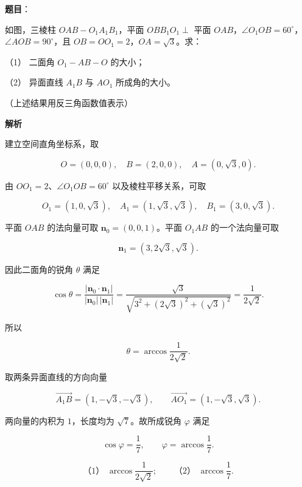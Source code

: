 \begin{answer}

\textbf{题目}：

如图，三棱柱 $OAB-O_1A_1B_1$，平面 $OBB_1O_1\perp$ 平面 $OAB$，$\angle O_1OB=60^\circ$，$\angle AOB=90^\circ$，且 $OB=OO_1=2$，$OA=\sqrt3$。求：
\nopagebreak[4]
\begin{center}\end{center}
\nopagebreak[4]
（1） 二面角 $O_1-AB-O$ 的大小；

（2） 异面直线 $A_1B$ 与 $AO_1$ 所成角的大小。

（上述结果用反三角函数值表示）

\textbf{解析}

建立空间直角坐标系，取

\nopagebreak[4]
\[
O=(0,0,0),\quad B=(2,0,0),\quad A=(0,\sqrt3,0).
\]

由 $OO_1=2$、$\angle O_1OB=60^\circ$ 以及棱柱平移关系，可取

\nopagebreak[4]
\[
O_1=(1,0,\sqrt3),\quad
A_1=(1,\sqrt3,\sqrt3),\quad
B_1=(3,0,\sqrt3).
\]


平面 $OAB$ 的法向量可取 $\boldsymbol n_0=(0,0,1)$。平面 $O_1AB$ 的一个法向量可取

\nopagebreak[4]
\[
\boldsymbol n_1=(3,2\sqrt3,\sqrt3).
\]

因此二面角的锐角 $\theta$ 满足

\nopagebreak[4]
\[
\cos\theta
=\frac{|\boldsymbol n_0\cdot\boldsymbol n_1|}
{|\boldsymbol n_0|\,|\boldsymbol n_1|}
=\frac{\sqrt3}{\sqrt{3^2+(2\sqrt3)^2+(\sqrt3)^2}}
=\frac1{2\sqrt2}.
\]

所以

\nopagebreak[4]
\[
\theta=\arccos\frac1{2\sqrt2}.
\]


取两条异面直线的方向向量

\nopagebreak[4]
\[
\overrightarrow{A_1B}=(1,-\sqrt3,-\sqrt3),\qquad
\overrightarrow{AO_1}=(1,-\sqrt3,\sqrt3).
\]

两向量的内积为 $1$，长度均为 $\sqrt7$。故所成锐角 $\varphi$ 满足

\nopagebreak[4]
\[
\cos\varphi=\frac1{7},
\qquad
\varphi=\arccos\frac17.
\]

\nopagebreak[4]
\[
\text{（1） }\arccos\frac1{2\sqrt2};
\qquad
\text{（2） }\arccos\frac17.
\]



\end{answer}
